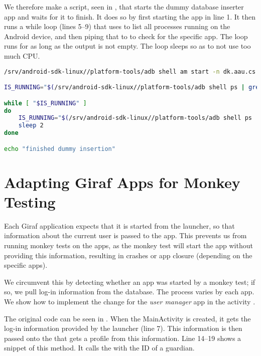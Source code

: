 We therefore make a script, seen in , that starts the dummy database inserter app and waits for it to finish. It does so by first starting the app in line 1. It then runs a while loop (lines 5--9) that uses  to list all processes running on the Android device, and then piping that to  to check for the specific app. The loop runs for as long as the output is not empty. The loop sleeps so as to not use too much CPU.

\begin{lstlisting}[language=bash,showstringspaces=false,caption=Start and wait for dummy database inserter,label=lst:start_wait_dummy_db_inserter]
/srv/android-sdk-linux//platform-tools/adb shell am start -n dk.aau.cs.giraf.dummydbinserter/dk.aau.cs.giraf.dummydbinserter.MainActivity

IS_RUNNING="$(/srv/android-sdk-linux//platform-tools/adb shell ps | grep dk.aau.cs.giraf.dummydbinserter)"

while [ "$IS_RUNNING" ]
do
    IS_RUNNING="$(/srv/android-sdk-linux//platform-tools/adb shell ps | grep dk.aau.cs.giraf.dummydbinserter)"
    sleep 2
done

echo "finished dummy insertion"
\end{lstlisting}

\section{Adapting Giraf Apps for Monkey Testing}
Each Giraf application expects that it is started from the launcher, so that information about the current user is passed to the app. This prevents us from running monkey tests on the apps, as the monkey test will start the app without providing this information, resulting in crashes or app closure (depending on the specific apps).

We circumvent this by detecting whether an app was started by a monkey test; if so, we pull log-in information from the database. The process varies by each app. We show how to implement the change for the \emph{user manager} app in the activity .

The original code can be seen in . When the MainActivity is created, it gets the log-in information provided by the launcher (line 7). This information is then passed onto the  that gets a profile from this information. Line 14--19 shows a snippet of this method. It calls the  with the ID of a guardian.

